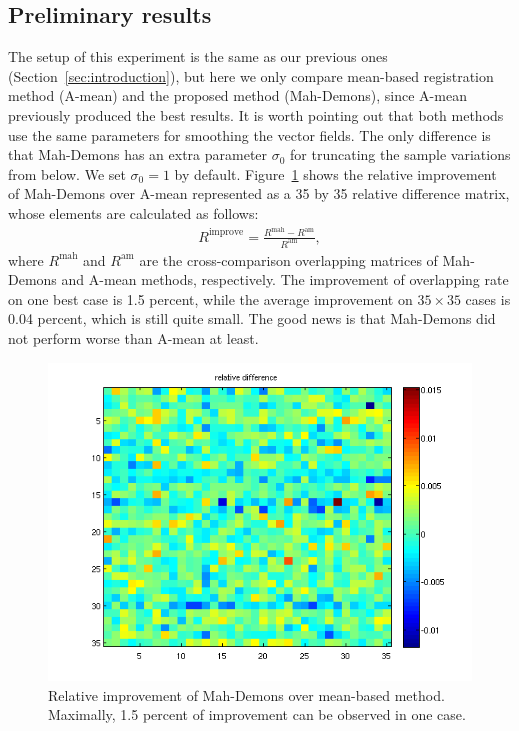 \documentclass[preprint,review,12pt]{elsarticle}
\newcommand{\OverlapMatMean}{R^{\text{am}}}
\newcommand{\OverlapMatMah}{R^{\text{mah}}}
\begin{document}
\subsection{Preliminary results}
The setup of this experiment is the same as our previous ones (Section~\ref{sec:introduction}), but here we only compare mean-based registration method (A-mean) and the proposed method (Mah-Demons), since A-mean previously produced the best results. It is worth pointing out that both methods use the same parameters for smoothing the vector fields. The only difference is that Mah-Demons has an extra parameter $\sigma_0$ for truncating the sample variations from below. We set $\sigma_0=1$ by default. 
Figure~\ref{fig:relative_mah} shows the relative improvement of Mah-Demons over A-mean represented as a 35 by 35 relative difference matrix, whose elements are calculated as follows:
\begin{align}
R^{\text{improve}}=\frac{\OverlapMatMah-\OverlapMatMean}{\OverlapMatMean},
\end{align}
where $\OverlapMatMah$ and $\OverlapMatMean$ are the cross-comparison overlapping matrices of Mah-Demons and A-mean methods, respectively.
The improvement of overlapping rate on one best case is 1.5 percent, while the average improvement on $35\times 35$ cases is 0.04 percent, which is still quite small. The good news is that Mah-Demons did not perform worse than A-mean at least.

\begin{figure}[h!!!!!!!!!!!!tb]
\begin{center}
	\includegraphics[width=.8\linewidth]{figs/relative_improvement.png}
\end{center}

\caption{Relative improvement of Mah-Demons over mean-based method. Maximally, 1.5 percent of improvement can be observed in one case.}
\label{fig:relative_mah}
\end{figure}
\end{document}
